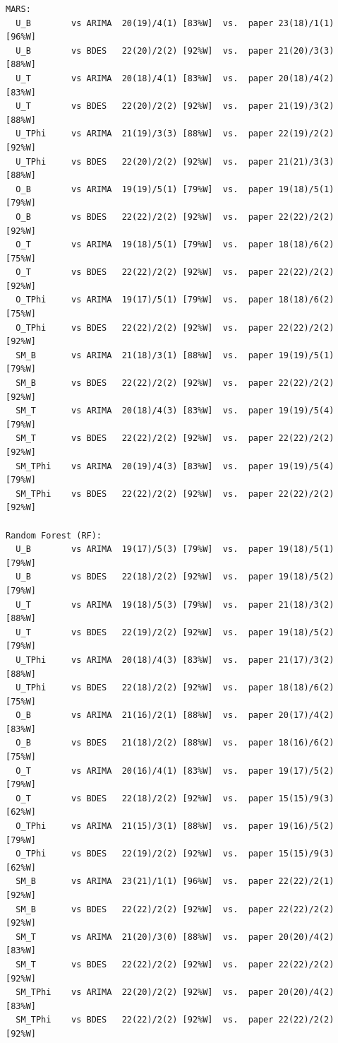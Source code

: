 \begin{verbatim}
MARS:
  U_B        vs ARIMA  20(19)/4(1) [83%W]  vs.  paper 23(18)/1(1) [96%W]
  U_B        vs BDES   22(20)/2(2) [92%W]  vs.  paper 21(20)/3(3) [88%W]
  U_T        vs ARIMA  20(18)/4(1) [83%W]  vs.  paper 20(18)/4(2) [83%W]
  U_T        vs BDES   22(20)/2(2) [92%W]  vs.  paper 21(19)/3(2) [88%W]
  U_TPhi     vs ARIMA  21(19)/3(3) [88%W]  vs.  paper 22(19)/2(2) [92%W]
  U_TPhi     vs BDES   22(20)/2(2) [92%W]  vs.  paper 21(21)/3(3) [88%W]
  O_B        vs ARIMA  19(19)/5(1) [79%W]  vs.  paper 19(18)/5(1) [79%W]
  O_B        vs BDES   22(22)/2(2) [92%W]  vs.  paper 22(22)/2(2) [92%W]
  O_T        vs ARIMA  19(18)/5(1) [79%W]  vs.  paper 18(18)/6(2) [75%W]
  O_T        vs BDES   22(22)/2(2) [92%W]  vs.  paper 22(22)/2(2) [92%W]
  O_TPhi     vs ARIMA  19(17)/5(1) [79%W]  vs.  paper 18(18)/6(2) [75%W]
  O_TPhi     vs BDES   22(22)/2(2) [92%W]  vs.  paper 22(22)/2(2) [92%W]
  SM_B       vs ARIMA  21(18)/3(1) [88%W]  vs.  paper 19(19)/5(1) [79%W]
  SM_B       vs BDES   22(22)/2(2) [92%W]  vs.  paper 22(22)/2(2) [92%W]
  SM_T       vs ARIMA  20(18)/4(3) [83%W]  vs.  paper 19(19)/5(4) [79%W]
  SM_T       vs BDES   22(22)/2(2) [92%W]  vs.  paper 22(22)/2(2) [92%W]
  SM_TPhi    vs ARIMA  20(19)/4(3) [83%W]  vs.  paper 19(19)/5(4) [79%W]
  SM_TPhi    vs BDES   22(22)/2(2) [92%W]  vs.  paper 22(22)/2(2) [92%W]

Random Forest (RF):
  U_B        vs ARIMA  19(17)/5(3) [79%W]  vs.  paper 19(18)/5(1) [79%W]
  U_B        vs BDES   22(18)/2(2) [92%W]  vs.  paper 19(18)/5(2) [79%W]
  U_T        vs ARIMA  19(18)/5(3) [79%W]  vs.  paper 21(18)/3(2) [88%W]
  U_T        vs BDES   22(19)/2(2) [92%W]  vs.  paper 19(18)/5(2) [79%W]
  U_TPhi     vs ARIMA  20(18)/4(3) [83%W]  vs.  paper 21(17)/3(2) [88%W]
  U_TPhi     vs BDES   22(18)/2(2) [92%W]  vs.  paper 18(18)/6(2) [75%W]
  O_B        vs ARIMA  21(16)/2(1) [88%W]  vs.  paper 20(17)/4(2) [83%W]
  O_B        vs BDES   21(18)/2(2) [88%W]  vs.  paper 18(16)/6(2) [75%W]
  O_T        vs ARIMA  20(16)/4(1) [83%W]  vs.  paper 19(17)/5(2) [79%W]
  O_T        vs BDES   22(18)/2(2) [92%W]  vs.  paper 15(15)/9(3) [62%W]
  O_TPhi     vs ARIMA  21(15)/3(1) [88%W]  vs.  paper 19(16)/5(2) [79%W]
  O_TPhi     vs BDES   22(19)/2(2) [92%W]  vs.  paper 15(15)/9(3) [62%W]
  SM_B       vs ARIMA  23(21)/1(1) [96%W]  vs.  paper 22(22)/2(1) [92%W]
  SM_B       vs BDES   22(22)/2(2) [92%W]  vs.  paper 22(22)/2(2) [92%W]
  SM_T       vs ARIMA  21(20)/3(0) [88%W]  vs.  paper 20(20)/4(2) [83%W]
  SM_T       vs BDES   22(22)/2(2) [92%W]  vs.  paper 22(22)/2(2) [92%W]
  SM_TPhi    vs ARIMA  22(20)/2(2) [92%W]  vs.  paper 20(20)/4(2) [83%W]
  SM_TPhi    vs BDES   22(22)/2(2) [92%W]  vs.  paper 22(22)/2(2) [92%W]


\end{verbatim}
